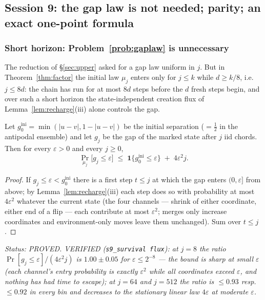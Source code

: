 \subsection{Session 9: the gap law is not needed; parity; an exact
one-point formula}\label{sec:s9}

\subsubsection{Short horizon: Problem~\ref{prob:gaplaw} is
unnecessary}\label{sec:shorthorizon}

The reduction of \S\ref{sec:upper} asked for a gap law uniform in $j$.
But in Theorem~\ref{thm:factor} the initial law $\mu_j$ enters only for
$j\le k$ while $d\ge k/8$, i.e.\ $j\le8d$: the chain has run for at
most $8d$ steps before the $d$ fresh steps begin, and over such a short
horizon the state-independent creation flux of
Lemma~\ref{lem:recharge}(iii) alone controls the gap.

\begin{proposition}\label{prop:shorthorizon}
Let $g_0^{\mathrm{ini}}=\min(|u-v|,1-|u-v|)$ be the initial separation
($=\tfrac12$ in the antipodal ensemble) and let $g_j$ be the gap of the
marked state after $j$ iid chords.  Then for every $\varepsilon>0$ and
every $j\ge0$,
\[
\Pr_{\mu_j}\bigl[g_j\le\varepsilon\bigr]
\;\le\;\mathbf 1\{g_0^{\mathrm{ini}}\le\varepsilon\}\;+\;4\varepsilon^2 j .
\]
\end{proposition}

\begin{proof}
If $g_j\le\varepsilon<g_0^{\mathrm{ini}}$ there is a first step
$t\le j$ at which the gap enters $(0,\varepsilon]$ from above; by
Lemma~\ref{lem:recharge}(iii) each step does so with probability at
most $4\varepsilon^2$ whatever the current state (the four channels
--- shrink of either coordinate, either end of a flip --- each
contribute at most $\varepsilon^2$; merges only increase coordinates
and environment-only moves leave them unchanged).  Sum over $t\le j$.
\end{proof}

\emph{Status: PROVED.  VERIFIED (\texttt{s9\_survival flux}): at
$j=8$ the ratio $\Pr[g_j\le\varepsilon]/(4\varepsilon^2j)$ is
$1.00\pm0.05$ for $\varepsilon\le2^{-8}$ --- the bound is
\emph{sharp} at small $\varepsilon$ (each channel's entry probability
is exactly $\varepsilon^2$ while all coordinates exceed
$\varepsilon$, and nothing has had time to escape); at $j=64$ and
$j=512$ the ratio is $\le0.93$ resp.\ $\le0.92$ in every bin and
decreases to the stationary linear law $4\varepsilon$ at moderate
$\varepsilon$.}

